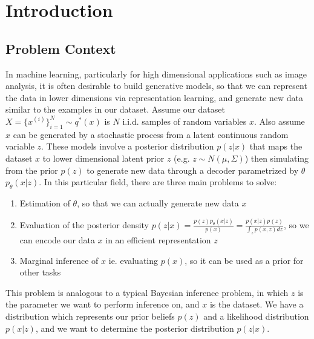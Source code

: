 \documentclass[honours,12pt]{unswthesis}
\newcommand\blankpage{%
    \null
    \thispagestyle{empty}%
    \addtocounter{page}{-1}%
    \newpage}
\numberwithin{equation}{section}
\theoremstyle{definition}
\begin{document}
\afterpreface

%
%

\afterpage{\blankpage}

\chapter{Introduction}\label{s-intro}


\section{Problem Context}
In machine learning, particularly for high dimensional applications such as image analysis, it is often desirable to build generative models, so that we can represent the data in lower dimensions via representation learning, and generate new data similar to the examples in our dataset. Assume our dataset $X=\{x^{(i)}\}^N_{i=1}\sim q^*(x)$ is $N$ i.i.d. samples of random variables $x$. Also assume $x$ can be generated by a stochastic process from a latent continuous random variable $z$. These models involve a posterior distribution $p(z|x)$ that maps the dataset $x$ to lower dimensional latent prior $z$ (e.g. $z\sim N(\mu,\Sigma)$) then simulating from the prior $p(z)$ to generate new data through a decoder parametrized by $\theta$ $p_\theta(x|z)$. In this particular field, there are three main problems to solve:
\begin{enumerate}
\item Estimation of $\theta$, so that we can actually generate new data $x$
\item Evaluation of the posterior density $p(z|x) = \frac{p(z)p_\theta(x|z)}{p(x)} = \frac{p(x|z)p(z)}{\int_z p(x,z)dz}$, so we can encode our data $x$ in an efficient representation $z$
\item Marginal inference of $x$ ie. evaluating $p(x)$, so it can be used as a prior for other tasks
\end{enumerate}
This problem is analogous to a typical Bayesian inference problem, in which $z$ is the parameter we want to perform inference on, and $x$ is the dataset. We have a distribution which represents our prior beliefs $p(z)$ and a likelihood distribution $p(x|z)$, and we want to determine the posterior distribution $p(z|x)$.
\end{document}
